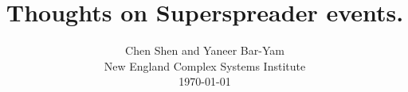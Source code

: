 \documentclass[onecolumn,journal]{IEEEtran}
\begin{document}
\title{\color{Brown} Thoughts on Superspreader events. \\
\vspace{-0.35ex}}
\author{Chen Shen and Yaneer Bar-Yam \\ New England Complex Systems Institute \\
 \today 
  \vspace{-10ex} \\ 

   
\bigskip
\bigskip

\textbf{}
 }
    
\maketitle


\flushbottom %



\thispagestyle{empty} %




\renewcommand{\thefootnote}{\fnsymbol{footnote}}
\end{document}
